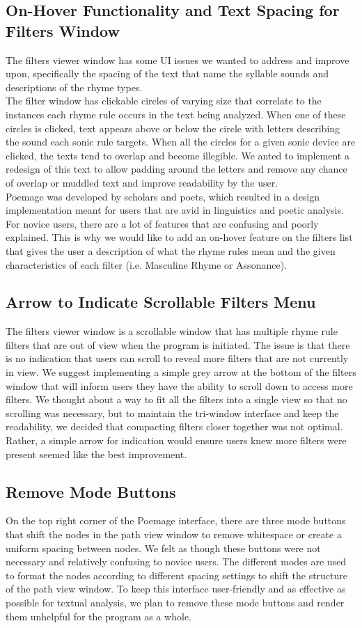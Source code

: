 \documentclass[journal]{vgtc}                %
\begin{document}
\subsection{On-Hover Functionality and Text Spacing for Filters Window}
The filters viewer window has some UI issues we wanted to address and improve upon, specifically the spacing of the text that name the syllable sounds and descriptions of the rhyme types.\\
\indent The filter window has clickable circles of varying size that correlate to the instances each rhyme rule occurs in the text being analyzed. When one of these circles is clicked, text appears above or below the circle with letters describing the sound each sonic rule targets. When all the circles for a given sonic device are clicked, the texts tend to overlap and become illegible. We anted to implement a redesign of this text to allow padding around the letters and remove any chance of overlap or muddled text and improve readability by the user.\\
\indent Poemage was developed by scholars and poets, which resulted in a design implementation meant for users that are avid in linguistics and poetic analysis. For novice users, there are a lot of features that are confusing and poorly explained. This is why we would like to add an on-hover feature on the filters list that gives the user a description of what the rhyme rules mean and the given characteristics of each filter (i.e. Masculine Rhyme or Assonance).
\subsection{Arrow to Indicate Scrollable Filters Menu}
The filters viewer window is a scrollable window that has multiple rhyme rule filters that are out of view when the program is initiated. The issue is that there is no indication that users can scroll to reveal more filters that are not currently in view. We suggest implementing a simple grey arrow at the bottom of the filters window that will inform users they have the ability to scroll down to access more filters. We thought about a way to fit all the filters into a single view so that no scrolling was necessary, but to maintain the tri-window interface and keep the readability, we decided that compacting filters closer together was not optimal. Rather, a simple arrow for indication would ensure users knew more filters were present seemed like the best improvement. 
\subsection{Remove Mode Buttons}
On the top right corner of the Poemage interface, there are three mode buttons that shift the nodes in the path view window to remove whitespace or create a uniform spacing between nodes. We felt as though these buttons were not necessary and relatively confusing to novice users. The different modes are used to format the nodes according to different spacing settings to shift the structure of the path view window. To keep this interface user-friendly and as effective as possible for textual analysis, we plan to remove these mode buttons and render them unhelpful for the program as a whole. 
\end{document}
